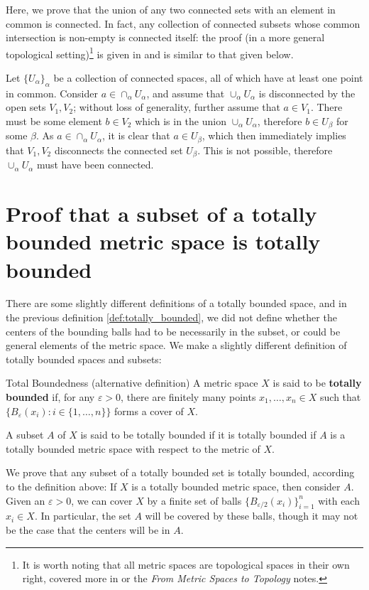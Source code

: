\begin{appendices}
Here, we prove that the union of any two connected sets with an element in common is connected. In fact, any collection of connected subsets whose common intersection is non-empty is connected itself: the proof (in a more general topological setting)\footnote{It is worth noting that all metric spaces are topological spaces in their own right, covered more in \cite{munkres} or the \emph{From Metric Spaces to Topology} notes.}  is given in \cite{munkres} and is similar to that given below. 

Let $\{U_{\alpha}\}_{\alpha}$ be a collection of connected spaces, all of which have at least one point in common. Consider \mbox{$a \in \cap_{\alpha} U_{\alpha}$}, and assume that \mbox{$\cup_{\alpha} U_{\alpha}$} is disconnected by the open sets $V_{1}, V_{2}$; without loss of generality, further assume that \mbox{$a\in V_{1}$.} There must be some element $b\in V_{2}$ which is in the union \mbox{$\cup_{\alpha} U_{\alpha}$}, therefore $b\in U_{\beta}$ for some $\beta$. As \mbox{$a \in \cap_{\alpha} U_{\alpha}$,} it is clear that $a\in U_{\beta}$, which then immediately implies that $V_{1},V_{2}$ disconnects the connected set $U_{\beta}$. This is not possible, therefore \mbox{$\cup_{\alpha} U_{\alpha}$} must have been connected.

\section{Proof that a subset of a totally bounded metric space is totally bounded}
There are some slightly different definitions of a totally bounded space, and in the previous definition \ref{def:totally_bounded}, we did not define whether the centers of the bounding balls had to be necessarily in the subset, or could be general elements of the metric space.
We make a slightly different definition of totally bounded spaces and subsets:
\begin{bdefin}{Total Boundedness (alternative definition)}{}
A metric space $X$ is said to be \textbf{totally bounded} if, for any $\varepsilon > 0$, there are finitely many points \mbox{$x_{1},\ldots, x_{n} \in X$} such that \mbox{$\{ B_{\varepsilon} (x_{i}) : i \in \{1,\ldots, n \} \}$} forms a cover of $X$.

A subset $A$ of $X$ is said to be totally bounded if it is totally bounded if $A$ is a totally bounded metric space with respect to the metric of $X$.
\end{bdefin}

We prove that any subset of a totally bounded set is totally bounded, according to the definition above: If $X$ is a totally bounded metric space, then consider $A$. Given an $\varepsilon>0$, we can cover $X$ by a finite set of balls \mbox{$\{ B_{\varepsilon/2}(x_{i})\}_{i=1}^{n} $} with each $x_{i} \in X$. In particular, the set $A$ will be covered by these balls, though it may not be the case that the centers will be in $A$.


\end{appendices}
